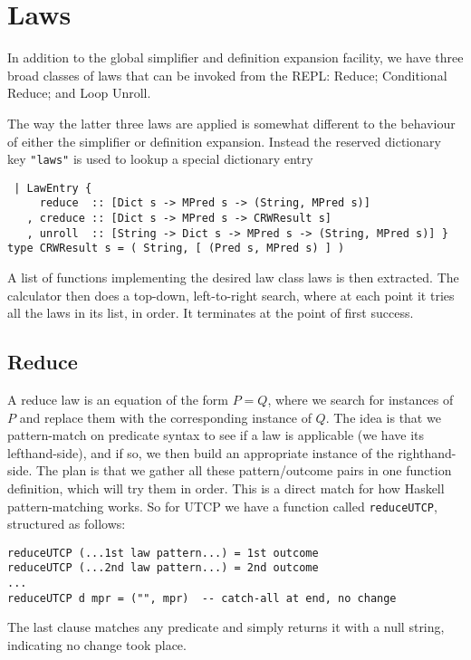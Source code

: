 \section{Laws}\label{sec:Laws}

In addition to the global simplifier and definition expansion facility,
we have three broad classes of laws that can be invoked from the REPL:
Reduce; Conditional Reduce; and Loop Unroll.

The way the latter three laws are applied is somewhat different
to the behaviour of either the simplifier or definition expansion.
Instead the reserved dictionary key \verb$"laws"$ is used
to lookup a special dictionary entry
\begin{verbatim}
 | LawEntry {
     reduce  :: [Dict s -> MPred s -> (String, MPred s)]
   , creduce :: [Dict s -> MPred s -> CRWResult s]
   , unroll  :: [String -> Dict s -> MPred s -> (String, MPred s)] }
type CRWResult s = ( String, [ (Pred s, MPred s) ] )
\end{verbatim}
A list of functions implementing the desired law class laws is then extracted.
The calculator then does a top-down, left-to-right search,
where at each point it tries all the laws in its list, in order.
It terminates at the point of first success.


\subsection{Reduce}

A reduce law is an equation of the form $P = Q$,
where we search for instances of $P$ and replace them with the
corresponding instance of $Q$.
The idea is that we pattern-match on predicate syntax
to see if a law is applicable (we have its lefthand-side),
and if so,
we then build an appropriate instance of the righthand-side.
The plan is that we gather all these pattern/outcome pairs
in one function definition,
which will try them in order.
This is a direct match for how Haskell pattern-matching works.
So for UTCP we have a function called \texttt{reduceUTCP},
structured as follows:
\begin{verbatim}
reduceUTCP (...1st law pattern...) = 1st outcome
reduceUTCP (...2nd law pattern...) = 2nd outcome
...
reduceUTCP d mpr = ("", mpr)  -- catch-all at end, no change
\end{verbatim}
The last clause matches any predicate
and simply returns it with a null string,
indicating no change took place.


